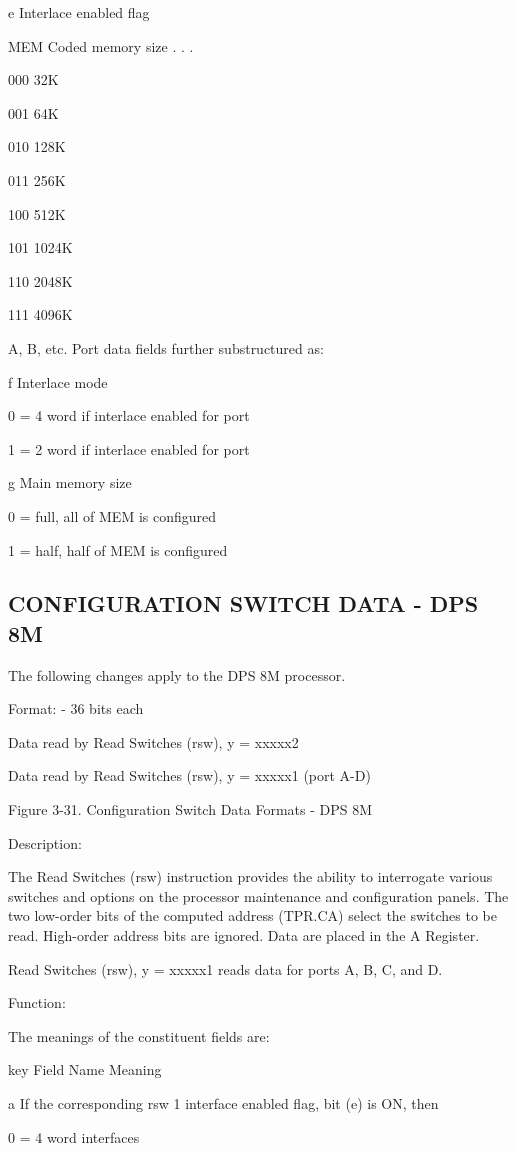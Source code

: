 e Interlace enabled flag

MEM Coded memory size . . .

000 32K

001 64K

010 128K

011 256K

100 512K

101 1024K

110 2048K

111 4096K

A, B, etc.  Port data fields further substructured as:

f Interlace mode

0 = 4 word if interlace enabled for port

1 = 2 word if interlace enabled for port

g Main memory size

0 = full, all of MEM is configured

1 = half, half of MEM is configured

\subsection{CONFIGURATION SWITCH DATA - DPS 8M}

The following changes apply to the DPS 8M processor.

Format: - 36 bits each

Data read by Read Switches (rsw), y = xxxxx2

Data read by Read Switches (rsw), y = xxxxx1 (port A-D)

Figure 3-31. Configuration Switch Data Formats - DPS 8M

Description:

The Read Switches (rsw) instruction provides the ability to interrogate various
switches and options on the processor maintenance and configuration panels. The
two low-order bits of the computed address (TPR.CA) select the switches to be
read. High-order address bits are ignored. Data are placed in the A Register.

Read Switches (rsw), y = xxxxx1 reads data for ports A, B, C, and D.

Function:

The meanings of the constituent fields are:

key Field Name Meaning

a If the corresponding rsw 1 interface enabled flag, bit (e) is ON, then

0 = 4 word interfaces

